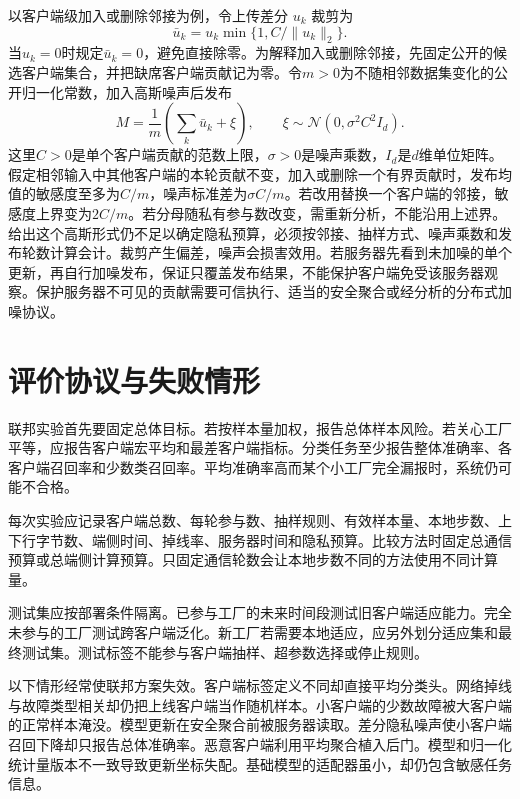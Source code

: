 以客户端级加入或删除邻接为例，令上传差分 $u_k$ 裁剪为
\begin{equation}
 \bar u_k=u_k\min\{1,C/\|u_k\|_2\}.
\end{equation}
当$u_k=0$时规定$\bar u_k=0$，避免直接除零。为解释加入或删除邻接，先固定公开的候选客户端集合，并把缺席客户端贡献记为零。令$m>0$为不随相邻数据集变化的公开归一化常数，加入高斯噪声后发布
\begin{equation}
 M=\frac1m\left(\sum_k\bar u_k+\xi\right),
 \qquad \xi\sim\mathcal N(0,\sigma^2C^2I_d).
 \label{eq:fed-client-dp-rewrite}
\end{equation}
这里$C>0$是单个客户端贡献的范数上限，$\sigma>0$是噪声乘数，$I_d$是$d$维单位矩阵。假定相邻输入中其他客户端的本轮贡献不变，加入或删除一个有界贡献时，发布均值的敏感度至多为$C/m$，噪声标准差为$\sigma C/m$。若改用替换一个客户端的邻接，敏感度上界变为$2C/m$。若分母随私有参与数改变，需重新分析，不能沿用上述界。给出这个高斯形式仍不足以确定隐私预算，必须按邻接、抽样方式、噪声乘数和发布轮数计算会计。裁剪产生偏差，噪声会损害效用。若服务器先看到未加噪的单个更新，再自行加噪发布，保证只覆盖发布结果，不能保护客户端免受该服务器观察。保护服务器不可见的贡献需要可信执行、适当的安全聚合或经分析的分布式加噪协议。

\section{评价协议与失败情形}

联邦实验首先要固定总体目标。若按样本量加权，报告总体样本风险。若关心工厂平等，应报告客户端宏平均和最差客户端指标。分类任务至少报告整体准确率、各客户端召回率和少数类召回率。平均准确率高而某个小工厂完全漏报时，系统仍可能不合格。

每次实验应记录客户端总数、每轮参与数、抽样规则、有效样本量、本地步数、上下行字节数、端侧时间、掉线率、服务器时间和隐私预算。比较方法时固定总通信预算或总端侧计算预算。只固定通信轮数会让本地步数不同的方法使用不同计算量。

测试集应按部署条件隔离。已参与工厂的未来时间段测试旧客户端适应能力。完全未参与的工厂测试跨客户端泛化。新工厂若需要本地适应，应另外划分适应集和最终测试集。测试标签不能参与客户端抽样、超参数选择或停止规则。

以下情形经常使联邦方案失效。客户端标签定义不同却直接平均分类头。网络掉线与故障类型相关却仍把上线客户端当作随机样本。小客户端的少数故障被大客户端的正常样本淹没。模型更新在安全聚合前被服务器读取。差分隐私噪声使小客户端召回下降却只报告总体准确率。恶意客户端利用平均聚合植入后门。模型和归一化统计量版本不一致导致更新坐标失配。基础模型的适配器虽小，却仍包含敏感任务信息。

